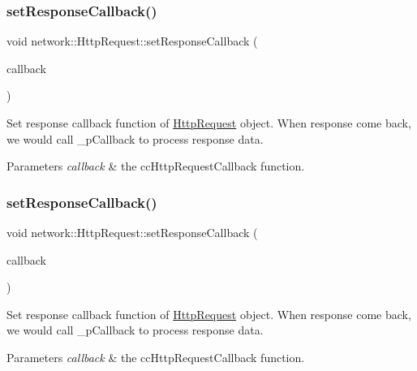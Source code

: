 \subsubsection{\texorpdfstring{set\+Response\+Callback()}{setResponseCallback()}\hspace{0.1cm}{\footnotesize\ttfamily [5/6]}}
{\footnotesize\ttfamily void network\+::\+Http\+Request\+::set\+Response\+Callback (\begin{DoxyParamCaption}\item[{const cc\+Http\+Request\+Callback \&}]{callback }\end{DoxyParamCaption})\hspace{0.3cm}{\ttfamily [inline]}}

Set response callback function of \hyperlink{classnetwork_1_1HttpRequest}{Http\+Request} object. When response come back, we would call \+\_\+p\+Callback to process response data.


\begin{DoxyParams}{Parameters}
{\em callback} & the cc\+Http\+Request\+Callback function. \\
\hline
\end{DoxyParams}
\mbox{\label{classnetwork_1_1HttpRequest_adc68acc891305b3066f10f4763e03748}} 
\subsubsection{\texorpdfstring{set\+Response\+Callback()}{setResponseCallback()}\hspace{0.1cm}{\footnotesize\ttfamily [6/6]}}
{\footnotesize\ttfamily void network\+::\+Http\+Request\+::set\+Response\+Callback (\begin{DoxyParamCaption}\item[{const cc\+Http\+Request\+Callback \&}]{callback }\end{DoxyParamCaption})\hspace{0.3cm}{\ttfamily [inline]}}

Set response callback function of \hyperlink{classnetwork_1_1HttpRequest}{Http\+Request} object. When response come back, we would call \+\_\+p\+Callback to process response data.


\begin{DoxyParams}{Parameters}
{\em callback} & the cc\+Http\+Request\+Callback function. \\
\hline
\end{DoxyParams}
\mbox{\label{classnetwork_1_1HttpRequest_a0e4f8ff5b153e624857183be498ef33d}} 

